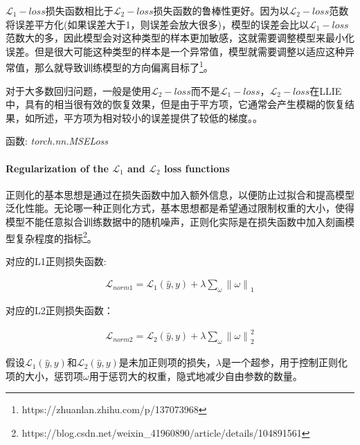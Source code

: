 \documentclass[letterpaper,12pt]{article}
\begin{document}
	$\mathcal{L}_1-loss$损失函数相比于$\mathcal{L}_2-loss$损失函数的鲁棒性更好。因为以$\mathcal{L}_2-loss$范数将误差平方化(如果误差大于1，则误差会放大很多)，模型的误差会比以$\mathcal{L}_1-loss$范数大的多，因此模型会对这种类型的样本更加敏感，这就需要调整模型来最小化误差。但是很大可能这种类型的样本是一个异常值，模型就需要调整以适应这种异常值，那么就导致训练模型的方向偏离目标了\footnote{https://zhuanlan.zhihu.com/p/137073968}。
	
	对于大多数回归问题，一般是使用$\mathcal{L}_2-loss$而不是$\mathcal{L}_1-loss$，$\mathcal{L}_2-loss$在LLIE中，具有的相当很有效的恢复效果，但是由于平方项，它通常会产生模糊的恢复结果，如\cite{tatarchenko2016multi}所述，平方项为相对较小的误差提供了较低的梯度。。
	
	函数: \textit{torch.nn.MSELoss}
	
	\paragraph{Regularization of the $\mathcal{L}_1$ and $\mathcal{L}_2$ loss functions}
	
	正则化的基本思想是通过在损失函数中加入额外信息，以便防止过拟合和提高模型泛化性能。无论哪一种正则化方式，基本思想都是希望通过限制权重的大小，使得模型不能任意拟合训练数据中的随机噪声，正则化实际是在损失函数中加入刻画模型复杂程度的指标\footnote{https://blog.csdn.net/weixin\_41960890/article/details/104891561}。
	
	对应的L1正则损失函数:
	
	\begin{equation}
		\begin{aligned}
			\mathcal{L}_{norm1} = \mathcal{L}_{1}{\left(\hat{y},y\right)} + \lambda \sum_{\omega}{\| \omega \|}_1
		\end{aligned}
	\end{equation}
	
	对应的L2正则损失函数：
	
	\begin{equation}
		\begin{aligned}
			\mathcal{L}_{norm2} = \mathcal{L}_{2}{\left(\hat{y},y\right)} + \lambda \sum_{\omega}{\| \omega \|}^2_2
		\end{aligned}
	\end{equation}
	
	假设$\mathcal{L}_{1}{\left(\hat{y},y\right)}$和$\mathcal{L}_{2}{\left(\hat{y},y\right)}$是未加正则项的损失，$\lambda$是一个超参，用于控制正则化项的大小，惩罚项$\omega$用于惩罚大的权重，隐式地减少自由参数的数量。
	
\end{document}
